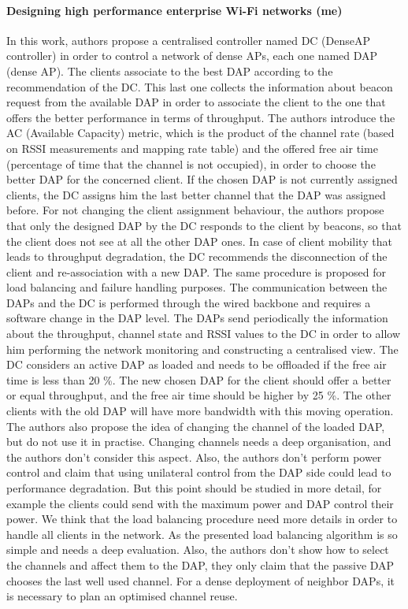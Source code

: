 \documentclass[journal,transmag]{IEEEtran}
\begin{document}
\paragraph{Designing high performance enterprise Wi-Fi networks\cite{08Design_high_wifi_entreprise} (me)} 
In this work, authors propose a centralised controller named DC (DenseAP controller) in order to control a network of dense APs, each one named DAP (dense AP). The clients associate to the best DAP according to the recommendation of the DC. This last one collects the information about beacon request from the available DAP in order to associate the client to the one that offers the better performance in terms of throughput. The authors introduce the AC (Available Capacity) metric, which is the product of the channel rate (based on RSSI measurements and mapping rate table) and the offered free air time (percentage of time that the channel is not occupied), in order to choose the better DAP for the concerned client. If the chosen DAP is not currently assigned clients, the DC assigns him the last better channel that the DAP was assigned before. For not changing the client assignment behaviour, the authors propose that only the designed DAP by the DC responds to the client by beacons, so that the client does not see at all the other DAP ones. In case of client mobility that leads to throughput degradation, the DC recommends the disconnection of the client and re-association with a new DAP. The same procedure is proposed for load balancing and failure handling purposes. The communication between the DAPs and the DC is performed through the wired backbone and requires a software change in the DAP level. The DAPs send periodically the information about the throughput, channel state and RSSI values to the DC in order to allow him performing the network monitoring and constructing a centralised view. The DC considers an active  DAP as loaded and needs to be offloaded if the free air time is less than 20 \%. The new chosen DAP for the client should offer a better or equal throughput, and the free air time should be higher by 25 \%. The other clients with the old DAP will have more bandwidth with this moving operation. The authors also propose the idea of changing the channel of the loaded DAP, but do not use it in practise. Changing channels needs a deep organisation, and the authors don't consider this aspect.      
Also, the authors don't perform power control and claim that using unilateral control from the DAP side could lead to performance degradation. But this point should be studied in more detail, for example the clients could send with the maximum power and DAP control their power. We think that the load balancing procedure need more details in order to handle all clients in the network. As the presented load balancing algorithm is so simple and needs a deep evaluation. Also, the authors don't show how to select the channels and affect them to the DAP, they only claim that the passive DAP chooses the last well used channel. For a dense deployment of neighbor DAPs, it is necessary to plan an optimised channel reuse. \\
\end{document}
